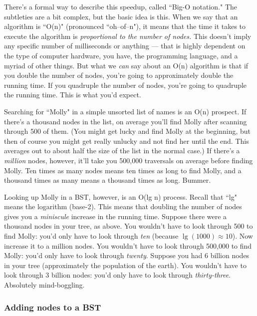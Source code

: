 There's a formal way to describe this speedup, called ``Big-O notation."
The subtleties are a bit complex, but the basic idea is this. When we say
that an algorithm is ``O(n)" (pronounced ``oh--of--n"), it means that the
time it takes to execute the algorithm is \textit{proportional to the
number of nodes.} This doesn't imply any specific number of milliseconds or
anything --- that is highly dependent on the type of computer hardware, you
have, the programming language, and a myriad of other things. But what we
\textit{can} say about an O(n) algorithm is that if you double the number
of nodes, you're going to approximately double the running time. If you
quadruple the number of nodes, you're going to quadruple the running time.
This is what you'd expect.

Searching for ``Molly" in a simple unsorted list of names is an O(n)
prospect. If there's a thousand nodes in the list, on average you'll find
Molly after scanning through 500 of them. (You might get lucky and find
Molly at the beginning, but then of course you might get really unlucky and
not find her until the end. This averages out to about half the size of the
list in the normal case.) If there's a \textit{million} nodes, however,
it'll take you 500,000 traversals on average before finding Molly. Ten
times as many nodes means ten times as long to find Molly, and a thousand
times as many means a thousand times as long. Bummer.

Looking up Molly in a BST, however, is an O(lg n) process. Recall that
``lg" means the logarithm (base-2). This means that doubling the number of
nodes gives you a \textit{miniscule} increase in the running time. Suppose
there were a thousand nodes in your tree, as above. You wouldn't have to
look through 500 to find Molly: you'd only have to look through
\textit{ten} (because $\lg(1000) \approx 10$). Now increase it to a million
nodes. You wouldn't have to look through 500,000 to find Molly: you'd only
have to look through \textit{twenty}. Suppose you had 6 billion nodes in
your tree (approximately the population of the earth). You wouldn't have to
look through 3 billion nodes: you'd only have to look through
\textit{thirty-three}. Absolutely mind-boggling.

\subsubsection{Adding nodes to a BST}

